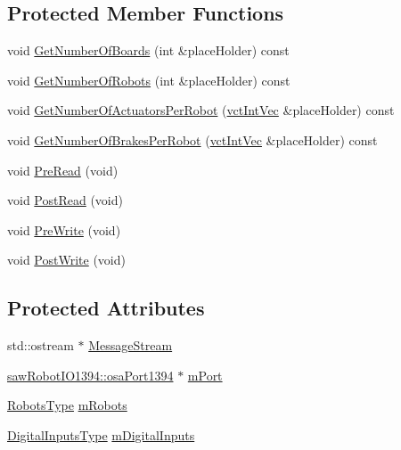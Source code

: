 \subsection*{Protected Member Functions}
\begin{DoxyCompactItemize}
\item 
void \hyperlink{classmts_robot_i_o1394_a47ed9c5990941c91395bee4ee5b34e64}{Get\+Number\+Of\+Boards} (int \&place\+Holder) const 
\item 
void \hyperlink{classmts_robot_i_o1394_ae125b7080fd3942ff3678465fa7283e6}{Get\+Number\+Of\+Robots} (int \&place\+Holder) const 
\item 
void \hyperlink{classmts_robot_i_o1394_adc86375c8f4679b60a646bd87c03577a}{Get\+Number\+Of\+Actuators\+Per\+Robot} (\hyperlink{vct_dynamic_vector_types_8h_a47260df0b570a25352b3f318ed0b4c4e}{vct\+Int\+Vec} \&place\+Holder) const 
\item 
void \hyperlink{classmts_robot_i_o1394_ac1408fa7ac109761a52db854208f5db6}{Get\+Number\+Of\+Brakes\+Per\+Robot} (\hyperlink{vct_dynamic_vector_types_8h_a47260df0b570a25352b3f318ed0b4c4e}{vct\+Int\+Vec} \&place\+Holder) const 
\item 
void \hyperlink{classmts_robot_i_o1394_aa975184d52423bcf59adb23b437924ec}{Pre\+Read} (void)
\item 
void \hyperlink{classmts_robot_i_o1394_a7c6fd64021f6d7d2497d76f1a4dfeae6}{Post\+Read} (void)
\item 
void \hyperlink{classmts_robot_i_o1394_a676bb81798faaf225e587f2775478a0b}{Pre\+Write} (void)
\item 
void \hyperlink{classmts_robot_i_o1394_a64991a4744e0701193bc6d80da015eb0}{Post\+Write} (void)
\end{DoxyCompactItemize}
\subsection*{Protected Attributes}
\begin{DoxyCompactItemize}
\item 
std\+::ostream $\ast$ \hyperlink{classmts_robot_i_o1394_a8d67ddd80442e47e158141ab5bcfdf1a}{Message\+Stream}
\item 
\hyperlink{classsaw_robot_i_o1394_1_1osa_port1394}{saw\+Robot\+I\+O1394\+::osa\+Port1394} $\ast$ \hyperlink{classmts_robot_i_o1394_a9bb22957cd6623ad743e6abf60ea187e}{m\+Port}
\item 
\hyperlink{classmts_robot_i_o1394_ab8da6d2d438f82df01169c5bd528c9b3}{Robots\+Type} \hyperlink{classmts_robot_i_o1394_a267e4918bbef8f40fcedffe3a9a6204d}{m\+Robots}
\item 
\hyperlink{classmts_robot_i_o1394_ad8b711c653d6fc68084cbe7817e066b9}{Digital\+Inputs\+Type} \hyperlink{classmts_robot_i_o1394_ae9b99471cc8a0b6c9b45cb987c1ac37c}{m\+Digital\+Inputs}
\end{DoxyCompactItemize}
